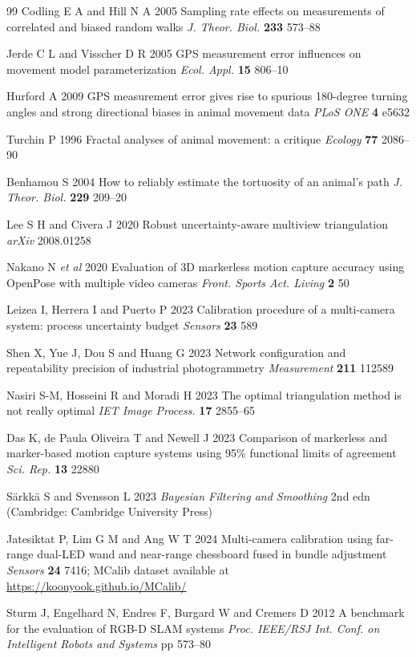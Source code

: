 \documentclass{iopjournal}
\begin{document}
\begin{thebibliography}{99}
 Codling E A and Hill N A 2005 Sampling rate effects on measurements
of correlated and biased random walks
\textit{J. Theor. Biol.} \textbf{233} 573--88

 Jerde C L and Visscher D R 2005 GPS measurement error influences on
movement model parameterization \textit{Ecol. Appl.} \textbf{15} 806--10

 Hurford A 2009 GPS measurement error gives rise to spurious
180-degree turning angles and strong directional biases in animal movement
data \textit{PLoS ONE} \textbf{4} e5632

 Turchin P 1996 Fractal analyses of animal movement: a critique
\textit{Ecology} \textbf{77} 2086--90

 Benhamou S 2004 How to reliably estimate the tortuosity of an
animal's path \textit{J. Theor. Biol.} \textbf{229} 209--20

 Lee S H and Civera J 2020 Robust uncertainty-aware multiview
triangulation \textit{arXiv} 2008.01258

 Nakano N \textit{et al} 2020 Evaluation of 3D markerless motion
capture accuracy using OpenPose with multiple video cameras
\textit{Front. Sports Act. Living} \textbf{2} 50

 Leizea I, Herrera I and Puerto P 2023 Calibration procedure of a
multi-camera system: process uncertainty budget
\textit{Sensors} \textbf{23} 589

 Shen X, Yue J, Dou S and Huang G 2023 Network configuration and
repeatability precision of industrial photogrammetry
\textit{Measurement} \textbf{211} 112589

 Nasiri S-M, Hosseini R and Moradi H 2023 The optimal triangulation
method is not really optimal \textit{IET Image Process.} \textbf{17} 2855--65

 Das K, de Paula Oliveira T and Newell J 2023 Comparison of
markerless and marker-based motion capture systems using 95\% functional
limits of agreement \textit{Sci. Rep.} \textbf{13} 22880

 S\"arkk\"a S and Svensson L 2023 \textit{Bayesian Filtering and
Smoothing} 2nd edn (Cambridge: Cambridge University Press)

 Jatesiktat P, Lim G M and Ang W T 2024 Multi-camera
calibration using far-range dual-LED wand and near-range chessboard fused in
bundle adjustment \textit{Sensors} \textbf{24} 7416; MCalib dataset available
at \url{https://koonyook.github.io/MCalib/}

 Sturm J, Engelhard N, Endres F, Burgard W and Cremers D 2012 A
benchmark for the evaluation of RGB-D SLAM systems \textit{Proc. IEEE/RSJ Int.
Conf. on Intelligent Robots and Systems} pp 573--80

\end{thebibliography}
\end{document}
